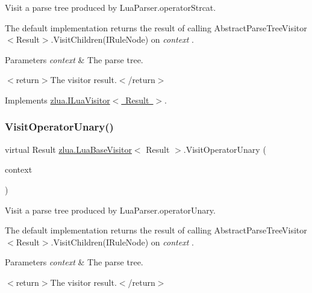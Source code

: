 Visit a parse tree produced by Lua\+Parser.\+operator\+Strcat. 

The default implementation returns the result of calling Abstract\+Parse\+Tree\+Visitor$<$\+Result$>$.\+Visit\+Children(\+I\+Rule\+Node) on {\itshape context} . 


\begin{DoxyParams}{Parameters}
{\em context} & The parse tree.\\
\hline
\end{DoxyParams}
$<$return$>$The visitor result.$<$/return$>$ 

Implements \mbox{\hyperlink{interfacezlua_1_1_i_lua_visitor_a1020362b6ec3e02795836cd5cd07cfe4}{zlua.\+I\+Lua\+Visitor$<$ Result $>$}}.

\mbox{\label{classzlua_1_1_lua_base_visitor_a3859047d2b178e3e90b387b1f694b496}} 
\subsubsection{\texorpdfstring{Visit\+Operator\+Unary()}{VisitOperatorUnary()}}
{\footnotesize\ttfamily virtual Result \mbox{\hyperlink{classzlua_1_1_lua_base_visitor}{zlua.\+Lua\+Base\+Visitor}}$<$ Result $>$.Visit\+Operator\+Unary (\begin{DoxyParamCaption}\item[{\mbox{[}\+Not\+Null\mbox{]} \mbox{\hyperlink{classzlua_1_1_lua_parser_1_1_operator_unary_context}{Lua\+Parser.\+Operator\+Unary\+Context}}}]{context }\end{DoxyParamCaption})\hspace{0.3cm}{\ttfamily [virtual]}}



Visit a parse tree produced by Lua\+Parser.\+operator\+Unary. 

The default implementation returns the result of calling Abstract\+Parse\+Tree\+Visitor$<$\+Result$>$.\+Visit\+Children(\+I\+Rule\+Node) on {\itshape context} . 


\begin{DoxyParams}{Parameters}
{\em context} & The parse tree.\\
\hline
\end{DoxyParams}
$<$return$>$The visitor result.$<$/return$>$ 

